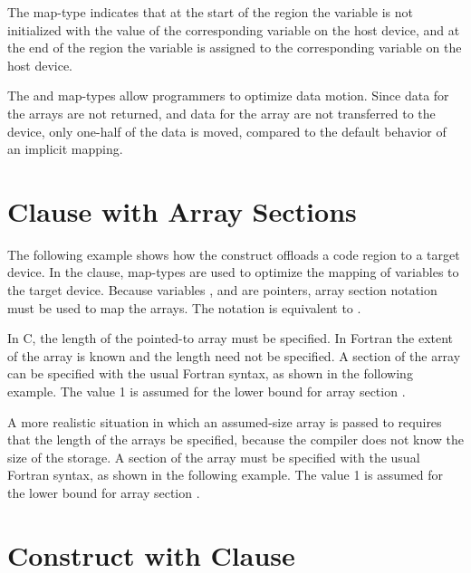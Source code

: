 The  map-type indicates that at the start of the  region 
the variable  is not initialized with the value of the corresponding variable 
on the host device, and at the end of the  region the variable  
is assigned to the corresponding variable on the host device.


The  and  map-types allow programmers to optimize data 
motion. Since data for the  arrays are not returned, and data for the  array 
are not transferred to the device, only one-half of the data is moved, compared 
to the default behavior of an implicit mapping.


\section{ Clause with Array Sections}

The following example shows how the  construct offloads a code region 
to a target device. In the  clause, map-types are used to optimize 
the mapping of variables to the target device. Because variables ,  and  are 
pointers, array section notation must be used to map the arrays. The notation  
is equivalent to .


In C, the length of the pointed-to array must be specified. In Fortran the extent 
of the array is known and the length need not be specified. A section of the array 
can be specified with the usual Fortran syntax, as shown in the following example. 
The value 1 is assumed for the lower bound for array section .


A more realistic situation in which an assumed-size array is passed to  
requires that the length of the arrays be specified, because the compiler does 
not know the size of the storage. A section of the array must be specified with 
the usual Fortran syntax, as shown in the following example. The value 1 is assumed 
for the lower bound for array section .


\section{ Construct with  Clause}

